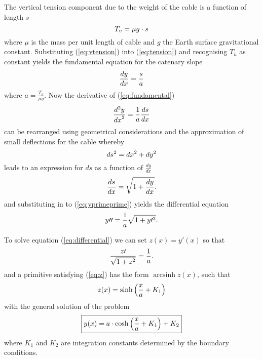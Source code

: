 \documentclass[11pt]{amsart}
\DeclareMathOperator{\arcsinh}{arcsinh}
\begin{document}
The vertical tension component due to the weight of the cable is a function of length $s$
\begin{equation}
	\centering
	T_{v}=\mu g \cdot s
	\label{eq:vtension}
\end{equation}
where $\mu$ is the mass per unit length of cable and $g$ the Earth surface gravitational constant.
Substituting (\ref{eq:vtension}) into (\ref{eq:tension}) and recognising $T_h$ as constant yields the fundamental equation for the catenary slope
\begin{equation}
	\centering
	\frac{dy}{dx} = \frac{s}{a} 
	\label{eq:fundamental}
\end{equation}
where $a=\frac{T_h}{\mu g}$.
Now the derivative of (\ref{eq:fundamental}) 
\begin{equation}
	\centering
	\frac{d^{2}y}{{dx}^2}=\frac{1}{a}\frac{ds}{dx}
	\label{eq:yprimeprime}
\end{equation}
can be rearranged using geometrical considerations and the approximation of small deflections for the cable whereby
\begin{equation}
	\centering
	ds^2=dx^2+dy^2
	\label{eq:elemental}
\end{equation}
leads to an expression for $ds$ as a function of $\frac{dy}{dx}$
\begin{equation}
	\centering
	\frac{ds}{dx} = \sqrt{1 + \frac{dy}{dx}}.
	\label{eq:ds}
\end{equation}
and substituting in to (\ref{eq:yprimeprime}) yields the differential equation 
\begin{equation}
	\centering
	y \prime \prime =\frac{1}{a} \sqrt{1 + y\prime ^2}.
	\label{eq:differential}
\end{equation}

To solve equation (\ref{eq:differential}) we can set $z(x)=y\prime(x)$ so that
\begin{equation}
	\centering
	\frac{z \prime}{\sqrt{1+z^2}} =\frac{1}{a}.
	\label{eq:z}
\end{equation}
and a primitive satisfying (\ref{eq:z}) has the form $\arcsinh{z(x)}$, such that
\begin{equation}
	\centering
	z(x)=\sinh \left(\frac{x}{a} + K_1 \right)
	\label{eq:z(x)}
\end{equation}
with the general solution of the problem
\begin{equation}
	\centering
	\boxed{y(x)=a \cdot \cosh \left(\frac{x}{a} + K_1 \right) + K_2}
	\label{eq:solution}
\end{equation}
where $K_1$ and $K_2$ are integration constants determined by the boundary conditions.
\end{document}
